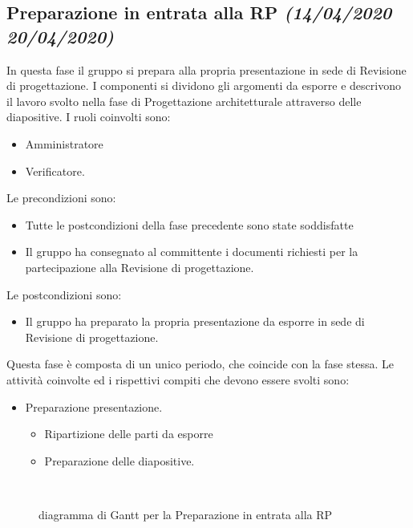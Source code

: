\documentclass[../piano-di-progetto.tex]{subfiles}
\begin{document}
\subsection[Preparazione in entrata alla RP]{Preparazione in entrata alla RP {\normalsize\normalfont\itshape(14/04/2020  20/04/2020)}}%
\label{sub:preparazione_in_entrata_alla_rp}
In questa fase il gruppo si prepara alla propria presentazione in sede di Revisione di progettazione.
I componenti si dividono gli argomenti da esporre e descrivono il lavoro svolto nella fase di Progettazione architetturale attraverso delle diapositive.
I ruoli coinvolti sono:
\begin{itemize}
  \item Amministratore
  \item Verificatore.
\end{itemize}
Le precondizioni sono:
\begin{itemize}
  \item Tutte le postcondizioni della fase precedente sono state soddisfatte
  \item Il gruppo ha consegnato al committente i documenti richiesti per la partecipazione alla Revisione di progettazione.
\end{itemize}
Le postcondizioni sono:
\begin{itemize}
  \item Il gruppo ha preparato la propria presentazione da esporre in sede di Revisione di progettazione.
\end{itemize}
Questa fase è composta di un unico periodo, che coincide con la fase stessa.
Le attività coinvolte ed i rispettivi compiti che devono essere svolti sono:
\begin{itemize}
  \item Preparazione presentazione.
  \begin{itemize}
    \item Ripartizione delle parti da esporre
    \item Preparazione delle diapositive.
  \end{itemize}
\end{itemize}
\begin{figure}[H]
  \centering
  
  \caption{diagramma di Gantt per la Preparazione in entrata alla RP}%
~~\label{fig:gantt_preparazione_rp}
\end{figure}
\end{document}
